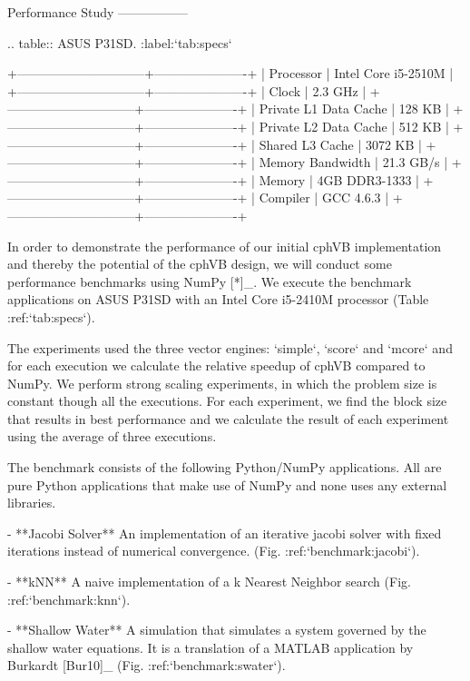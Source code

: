 
Performance Study
-----------------

.. table:: ASUS P31SD. :label:`tab:specs`

   +------------------------------+----------------------+
   | Processor                    | Intel Core i5-2510M  |
   +------------------------------+----------------------+
   | Clock                        | 2.3 GHz              |     	
   +------------------------------+----------------------+
   | Private L1 Data Cache        | 128 KB               |
   +------------------------------+----------------------+
   | Private L2 Data Cache        | 512 KB               |
   +------------------------------+----------------------+
   | Shared L3 Cache              | 3072 KB              |
   +------------------------------+----------------------+
   | Memory Bandwidth             | 21.3 GB/s            |
   +------------------------------+----------------------+
   | Memory                       | 4GB DDR3-1333        |
   +------------------------------+----------------------+
   | Compiler                     | GCC 4.6.3            |
   +------------------------------+----------------------+

In order to demonstrate the performance of our initial cphVB implementation and thereby the potential of the cphVB design, we will conduct some performance benchmarks using NumPy [*]_. We execute the benchmark applications on ASUS P31SD with an Intel Core i5-2410M processor (Table :ref:`tab:specs`). 

The experiments used the three vector engines: `simple`, `score` and `mcore` and for each execution we calculate the relative speedup of cphVB compared to NumPy. We perform strong scaling experiments, in which the problem size is constant though all the executions. For each experiment, we find the block size that results in best performance and we calculate the result of each experiment using the average of three executions.

The benchmark consists of the following Python/NumPy applications. All are pure Python applications that make use of NumPy and none uses any external libraries.

 - **Jacobi Solver** An implementation of an iterative jacobi solver with fixed iterations instead of numerical convergence. (Fig. :ref:`benchmark:jacobi`). 

 - **kNN** A naive implementation of a k Nearest Neighbor search (Fig. :ref:`benchmark:knn`). 

 - **Shallow Water** A simulation that simulates a system governed by the shallow water equations. It is a translation of a MATLAB application by Burkardt [Bur10]_ (Fig. :ref:`benchmark:swater`). 

